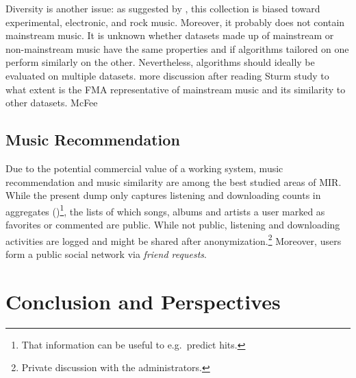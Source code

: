 \documentclass{article}
\newcommand{\todo}[1]{{\color{red} #1}}
\begin{document}
Diversity is another issue: as suggested by , this collection is biased toward experimental, electronic, and rock music. Moreover, it probably does not contain mainstream music.
It is unknown whether datasets made up of mainstream or non-mainstream music have the same properties and if algorithms tailored on one perform similarly on the other. Nevertheless, algorithms should ideally be evaluated on multiple datasets.
\todo{more discussion after reading Sturm}
study to what extent is the FMA representative of mainstream music and its similarity to other datasets.
\todo{McFee}


\subsection{Music Recommendation} %

Due to the potential commercial value of a working system, music recommendation and music similarity are among the best studied areas of MIR.
While the present dump only captures listening and downloading counts in aggregates ()\footnote{That information can be useful to e.g.\ predict hits.}, the lists of which songs, albums and artists a user marked as favorites or commented are public. While not public, listening and downloading activities are logged and might be shared after anonymization.\footnote{Private discussion with the administrators.} Moreover, users form a public social network via \textit{friend requests}.


\section{Conclusion and Perspectives}
\end{document}
